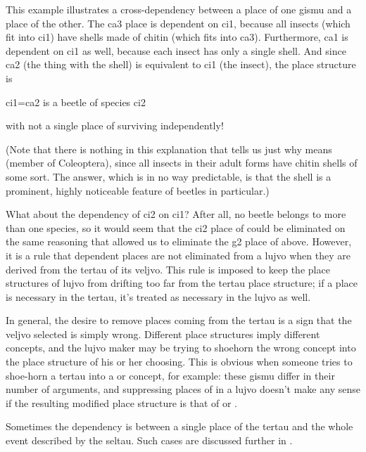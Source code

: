 This example illustrates a cross-dependency between a place of
    one gismu and a place of the other. The ca3 place is dependent
    on ci1, because all insects (which fit into ci1) have shells
    made of chitin (which fits into ca3). Furthermore, ca1 is
    dependent on ci1 as well, because each insect has only a single
    shell. And since ca2 (the thing with the shell) is equivalent
    to ci1 (the insect), the place structure is
\begin{example}
ci1=ca2 is a beetle of species ci2
\end{example}

{\noindent}with not a single place of  surviving independently! 

(Note that there is nothing in this explanation that tells
    us just why  means  (member of
    Coleoptera), since all insects in their adult forms have chitin
    shells of some sort. The answer, which is in no way
    predictable, is that the shell is a prominent, highly
    noticeable feature of beetles in particular.)

What about the dependency of ci2 on ci1? After all, no
    beetle belongs to more than one species, so it would seem that
    the ci2 place of  could be eliminated on the same
    reasoning that allowed us to eliminate the g2 place of
     above. However, it is a rule that dependent places
    are not eliminated from a lujvo when they are derived from the
    tertau of its veljvo. This rule is imposed to keep the place
    structures of lujvo from drifting too far from the tertau place
    structure; if a place is necessary in the tertau, it's treated
    as necessary in the lujvo as well.

In general, the desire to remove places coming from the
    tertau is a sign that the veljvo selected is simply wrong.
    Different place structures imply different concepts, and the
    lujvo maker may be trying to shoehorn the wrong concept into
    the place structure of his or her choosing. This is obvious
    when someone tries to shoe-horn a  tertau into a
     or  concept, for example: these gismu differ
    in their number of arguments, and suppressing places of
     in a lujvo doesn't make any sense if the resulting
    modified place structure is that of  or .

Sometimes the dependency is between a single place of the
    tertau and the whole event described by the seltau. Such cases
    are discussed further in .

